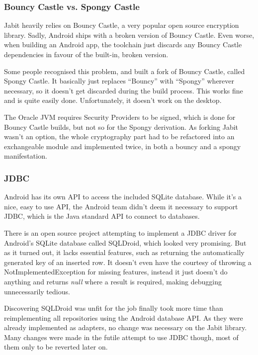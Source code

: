 \documentclass{bfh}
\begin{document}
  \subsubsection{Bouncy Castle vs. Spongy Castle}
  \label{subsec:bcvssc}
  Jabit heavily relies on Bouncy Castle, a very popular open source encryption library.\cite{bouncy} Sadly, Android ships with a broken version of Bouncy Castle. Even worse, when building an Android app, the toolchain just discards any Bouncy Castle dependencies in favour of the built-in, broken version.

  Some people recognised this problem, and built a fork of Bouncy Castle, called Spongy Castle. It basically just replaces “Bouncy” with “Spongy” wherever necessary, so it doesn’t get discarded during the build process. This works fine and is quite easily done. Unfortunately, it doesn’t work on the desktop.

  The Oracle JVM requires Security Providers to be signed, which is done for Bouncy Castle builds, but not so for the Spongy derivation. As forking Jabit wasn’t an option, the whole cryptography part had to be refactored into an exchangeable module and implemented twice, in both a bouncy and a spongy manifestation.

  \subsubsection{JDBC}
  \label{subsec:jdbc}
  Android has its own API to access the included SQLite database. While it’s a nice, easy to use \ac{API}, the Android team didn’t deem it necessary to support \ac{JDBC}, which is the Java standard API to connect to databases.

  There is an open source project attempting to implement a \ac{JDBC} driver for Android’s SQLite database called SQLDroid, which looked very promising. But as it turned out, it lacks essential features, such as returning the automatically generated key of an inserted row. It doesn't even have the courtesy of throwing a NotImplementedException for missing features, instead it just doesn't do anything and returns \textit{null} where a result is required, making debugging unnecessarily tedious.\cite{github:sqldroid}

  Discovering SQLDroid was unfit for the job finally took more time than reimplementing all repositories using the Android database API. As they were already implemented as adapters, no change was necessary on the Jabit library. Many changes were made in the futile attempt to use JDBC though, most of them only to be reverted later on.
\end{document}
